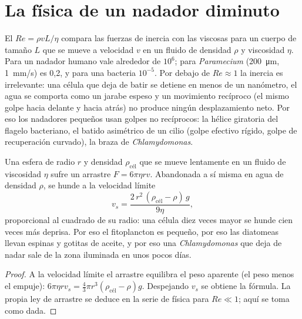 \section{La física de un nadador diminuto}

\begin{proposition}\label{prop:b2:unicellular-diversity:reynolds}
El \emph{} $Re = \rho v L/\eta$ compara las fuerzas de
inercia con las viscosas para un cuerpo de tamaño $L$ que se mueve a
velocidad $v$ en un fluido de densidad $\rho$ y viscosidad $\eta$. Para
un nadador humano vale alrededor de $10^6$; para \emph{Paramecium}
(\qty{200}{\micro m}, \qty{1}{mm/s}) es 0,2, y para una bacteria
$10^{-5}$. Por debajo de $Re \approx 1$ la inercia es irrelevante: una
célula que deja de batir se detiene en menos de un nanómetro, el agua se
comporta como un jarabe espeso y un movimiento recíproco (el mismo golpe
hacia delante y hacia atrás) no produce ningún desplazamiento neto. Por
eso los nadadores pequeños usan golpes no recíprocos: la hélice giratoria
del flagelo bacteriano, el batido asimétrico de un cilio (golpe efectivo
rígido, golpe de recuperación curvado), la braza de
\emph{Chlamydomonas}.
\end{proposition}

\begin{theorem}\label{thm:b2:unicellular-diversity:stokes}
Una esfera de radio $r$ y densidad $\rho_{\text{cél}}$ que se mueve
lentamente en un fluido de viscosidad $\eta$ sufre un arrastre
$F = 6\pi\eta r v$. Abandonada a sí misma en agua de densidad $\rho$, se
hunde a la velocidad límite
\[
v_s = \frac{2\,r^2\,(\rho_{\text{cél}} - \rho)\,g}{9\eta},
\]
proporcional al cuadrado de su radio: una célula diez veces mayor se
hunde cien veces más deprisa. Por eso el fitoplancton es pequeño, por
eso las diatomeas llevan espinas y gotitas de aceite, y por eso una
\emph{Chlamydomonas} que deja de nadar sale de la zona iluminada en unos
pocos días.
\end{theorem}
\begin{proof}
A la velocidad límite el arrastre equilibra el peso aparente (el peso
menos el empuje): $6\pi\eta r v_s = \tfrac{4}{3}\pi r^3
(\rho_{\text{cél}} - \rho) g$. Despejando $v_s$ se obtiene la fórmula.
La propia ley de arrastre se deduce en la serie de física para
$Re \ll 1$; aquí se toma como dada.
\end{proof}

